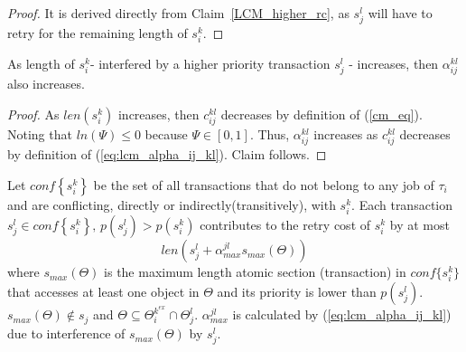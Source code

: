 %
\begin{proof}\normalfont
It is derived directly from Claim~\ref{LCM_higher_rc}, as $s_j^l$ will have to retry for the remaining length of $s_i^k$.
\end{proof}
%
\begin{clm}\label{clm:alpha_increase_with_max_interfered}
As length of $s_i^k$- interfered by a higher priority transaction $s_j^l$ - increases, then $\alpha_{ij}^{kl}$ also increases.
\end{clm}
%
\begin{proof}\normalfont
%
As $len\left(s_i^k\right)$ increases, then $c_{ij}^{kl}$ decreases by definition of (\ref{cm_eq}). Noting that $ln(\Psi) \le 0$ because $\Psi \in [0,1]$. Thus, $\alpha_{ij}^{kl}$ increases as $c_{ij}^{kl}$ decreases by definition of (\ref{eq:lcm_alpha_ij_kl}). Claim follows.
%
\end{proof}
%
\begin{clm}\label{clm:lcm_effect_one_tx_in_rc_multiple_txs_higher_priority}
%
Let $conf\left\{ s_{i}^{k}\right\} $ be the set of all transactions
that do not belong to any job of $\tau_{i}$ and are conflicting, directly or indirectly(transitively), with
$s_{i}^{k}$. Each transaction $s_{j}^{l}\in conf\left\{ s_{i}^{k}\right\},\,p\left(s_j^l\right)>p\left(s_i^k\right) $
contributes to the retry cost of $s_{i}^{k}$ by at most 
\begin{equation}
len\left(s_{j}^{l}+\alpha_{max}^{jl}s_{max}(\Theta)\right)\label{eq:lcm_effect_one_tx_in_rc_multiple_txs_higher_priority}
\end{equation}
where $s_{max}(\Theta)$ is the maximum length atomic section
(transaction) in $conf\{s_{i}^{k}\}$ that accesses at least one object in $\Theta$ and its priority is lower than $p(s_{j}^{l})$. $s_{max}\left(\Theta\right) \not\in s_{j}$ and $\Theta\subseteq\Theta_{i}^{k^{ex}}\cap\Theta_{j}^{l}$. $\alpha_{max}^{jl}$ is calculated by (\ref{eq:lcm_alpha_ij_kl}) due to interference of $s_{max}\left(\Theta\right)$ by $s_j^l$.
%
\end{clm}
%
